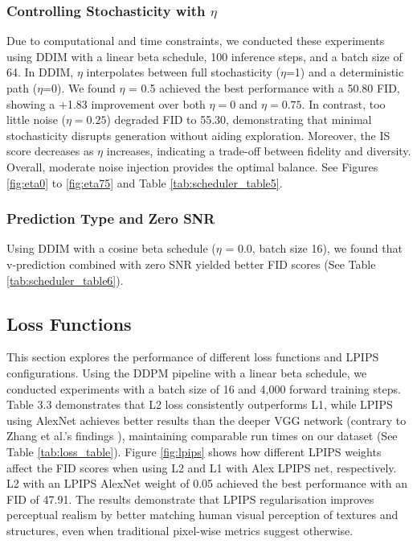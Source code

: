 \documentclass[conference]{IEEEtran}
\begin{document}
\subsubsection{Controlling Stochasticity with $\eta$}

Due to computational and time constraints, we conducted these experiments using DDIM with a linear beta schedule, 100 inference steps, and a batch size of 64. In DDIM, $\eta$ interpolates between full stochasticity ($\eta$=1) and a deterministic path ($\eta$=0). We found $\eta$ = 0.5 achieved the best performance with a 50.80 FID, showing a +1.83 improvement over both $\eta=0$ and $\eta=0.75$. In contrast, too little noise ($\eta=0.25$) degraded FID to 55.30, demonstrating that minimal stochasticity disrupts generation without aiding exploration. Moreover, the IS score decreases as $\eta$ increases, indicating a trade-off between fidelity and diversity. Overall, moderate noise injection provides the optimal balance. See Figures \ref{fig:eta0} to \ref{fig:eta75} and Table \ref{tab:scheduler_table5}.

\subsubsection{Prediction Type and Zero SNR}

Using DDIM with a cosine beta schedule ($\eta$ = 0.0, batch size 16), we found that v-prediction combined with zero SNR yielded better FID scores (See Table \ref{tab:scheduler_table6}).

\subsection{Loss Functions}\label{e_loss}

This section explores the performance of different loss functions and LPIPS configurations. Using the DDPM pipeline with a linear beta schedule, we conducted experiments with a batch size of 16 and 4,000 forward training steps. Table 3.3 demonstrates that L2 loss consistently outperforms L1, while LPIPS using AlexNet achieves better results than the deeper VGG network (contrary to Zhang et al.'s findings \cite{zhangUnreasonableEffectivenessDeep2018}), maintaining comparable run times on our dataset (See Table \ref{tab:loss_table}). Figure \ref{fig:lpips} shows how different LPIPS weights affect the FID scores when using L2 and L1 with Alex LPIPS net, respectively. L2 with an LPIPS AlexNet weight of 0.05 achieved the best performance with an FID of 47.91. The results demonstrate that LPIPS regularisation improves perceptual realism by better matching human visual perception of textures and structures, even when traditional pixel-wise metrics suggest otherwise.
\end{document}
